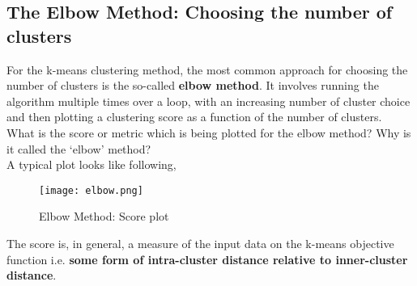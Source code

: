 	\subsection{\textbf{The Elbow Method}: Choosing the number of clusters}
		For the k-means clustering method, the most common approach for choosing the number of clusters is the so-called \textbf{elbow method}. It involves running the algorithm multiple times over a loop, with an increasing number of cluster choice and then plotting a clustering score as a function of the number of clusters.\\

		What is the score or metric which is being plotted for the elbow method? Why is it called the ‘elbow’ method?\\

		A typical plot looks like following,

		\begin{figure}[h]
			\centering
			\texttt{[image: elbow.png]}
			\caption{Elbow Method: Score plot}
		\end{figure}

		The score is, in general, a measure of the input data on the k-means objective function i.e. \textbf{some form of intra-cluster distance relative to inner-cluster distance}.
